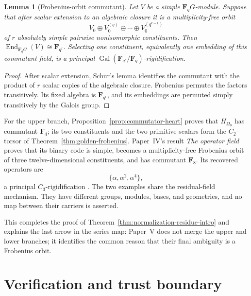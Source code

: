 \documentclass[11pt]{article}
\newtheorem{lemma}[theorem]{Lemma}
\theoremstyle{definition}
\theoremstyle{remark}
\newcommand{\F}{\mathbf F}
\newcommand{\End}{\operatorname{End}}
\newcommand{\Gal}{\operatorname{Gal}}
\begin{document}
\begin{lemma}[Frobenius-orbit commutant]
\label{lem:frobenius-orbit-commutant}
Let \(V\) be a simple \(\F_qG\)-module.  Suppose that after scalar extension
to an algebraic closure it is a multiplicity-free orbit
\[
               V_0\oplus V_0^{(q)}\oplus\cdots\oplus V_0^{(q^{r-1})}
\]
of \(r\) absolutely simple pairwise nonisomorphic constituents.  Then
\(\End_{\F_qG}(V)\cong\F_{q^r}\).  Selecting one constituent, equivalently
one embedding of this commutant field, is a principal
\(\Gal(\F_{q^r}/\F_q)\)-rigidification.
\end{lemma}

\begin{proof}
After scalar extension, Schur's lemma identifies the commutant with the
product of \(r\) scalar copies of the algebraic closure.  Frobenius permutes
the factors transitively.  Its fixed algebra is \(\F_{q^r}\), and its
embeddings are permuted simply transitively by the Galois group.
\end{proof}

For the upper branch, Proposition~\ref{prop:commutator-heart} proves that
\(H_{\Omega_0}\) has commutant \(\F_4\); its two constituents and the two
primitive scalars form the \(C_2\)-torsor of
Theorem~\ref{thm:golden-frobenius}.  Paper~IV's result \emph{The operator
field} proves that its binary code is simple, becomes a multiplicity-free
Frobenius orbit of three twelve-dimensional constituents, and has commutant
\(\F_8\).  Its recovered
operators are
\[
                         \{\alpha,\alpha^2,\alpha^4\},
\]
a principal \(C_3\)-rigidification \cite{RuddPassant2026}.  The two examples
share the residual-field mechanism.  They have different groups, modules,
bases, and geometries, and no map between their carriers is asserted.

This completes the proof of Theorem~\ref{thm:normalization-residue-intro}
and explains the last arrow in the series map: Paper~V does not merge the
upper and lower branches; it identifies the common reason that their final
ambiguity is a Frobenius orbit.

\section{Verification and trust boundary}
\label{sec:verification}
\end{document}
